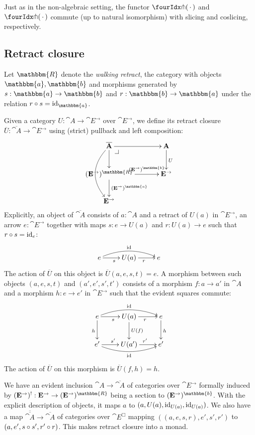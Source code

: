 \documentclass[reqno,10pt,a4paper,oneside]{amsart}
\begin{document}
\begin{remark}
\label{pitchfork-slicing}
Just as in the non-algebraic setting, the functor $\liftr{\brarghole}$ and $\liftl{\brarghole}$ commute (up to natural isomorphism) with slicing and coslicing, respectively.
\end{remark}

\subsection{Retract closure}

\newcommand{\ret}{\mathbbm{R}}
\newcommand{\retA}{\mathbbm{a}}
\newcommand{\retB}{\mathbbm{b}}

Let $\ret$ denote the \emph{walking retract}, \ie the category with objects $\retA, \retB$ and morphisms generated by $s : \retA \to \retB$ and $r : \retB \to \retA$ under the relation $r \cc s = \id_{\retA}$.

Given a category $U : \cat{A} \to \cat{E}^{\to}$ over $\cat{E}^{\to}$, we define its retract closure $\overline{U} : \overline{\cat{A}} \to \cat{E}^{\to}$ using (strict) pullback and left composition:
\[
\xymatrix@C+1em{
  \overline{\cat{A}}
  \ar[r]
  \ar[d]
  \ar@/_2em/[dd]_{\overline{U}}
  \pullback{dr}
&
  \cat{A}
  \ar[d]^{U}
\\
  (\cat{E}^{\to})^{\ret}
  \ar[r]^-{(\cat{E}^{\to})^{\retB}}
  \ar[d]^{(\cat{E}^{\to})^{\retA}}
&
  \cat{E}^{\to}
\\
  \cat{E}^{\to}
}
\]
Explicitly, an object of $\overline{\cat{A}}$ consists of $a : \cat{A}$ and a retract of $U(a)$ in $\cat{E}^{\to}$, \ie an arrow $e : \cat{E}^{\to}$ together with maps $s : e \to U(a)$ and $r : U(a) \to e$ such that $r \mathbin{\circ} s = \operatorname{id}_e$:
\[
\xymatrix{
  e
  \ar[r]_{s}
  \ar@/^1em/[rr]^{\id}
&
  U(a)
  \ar[r]_{r}
&
  e
}
\]
The action of $\overline{U}$ on this object is $\overline{U}(a, e, s, t) = e$.
A morphism between such objects $(a, e, s, t)$ and $(a', e', s', t')$ consists of a morphism $f : a \to a'$ in $\cat{A}$ and a morphism $h : e \to e'$ in $\cat{E}^{\to}$ such that the evident squares commute:
\[
\xymatrix{
  e
  \ar[r]_{s}
  \ar@/^1em/[rr]^{\id}
  \ar[d]_{h}
&
  U(a)
  \ar[r]_{r}
  \ar[d]^{U(f)}
&
  e
  \ar[d]^{h}
\\
  e'
  \ar[r]^{s'}
  \ar@/_1em/[rr]_{\id}
&
  U(a')
  \ar[r]^{r'}
&
  e'
}
\]
The action of $\overline{U}$ on this morphism is $\overline{U}(f, h) = h$.

We have an evident inclusion $\cat{A} \to \overline{\cat{A}}$ of categories over $\cat{E}^{\to}$ formally induced by $(\cat{E}^{\to})^{\canonical} : \cat{E}^{\to} \to (\cat{E}^{\to})^{\ret}$ being a section to $(\cat{E}^{\to})^{\retB}$.
With the explicit description of objects, it maps $a$ to $(a, U(a), \operatorname{id}_{U(a)}, \operatorname{id}_{U(a)})$.
We also have a map $\overline{\overline{\cat{A}}} \to \overline{\cat{A}}$ of categories over $\cat{E}^{\Box}$ mapping $((a, e, s, r), e', s', r')$ to $(a, e', s \mathbin{\circ} s', r' \mathbin{\circ} r)$.
This makes retract closure into a monad.
\end{document}
